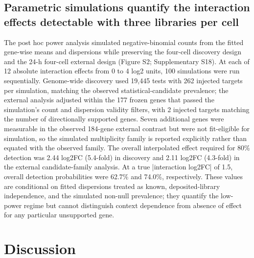 \documentclass[12pt,letterpaper]{article}
\begin{document}
\subsection*{Parametric simulations quantify the interaction effects detectable with three libraries per cell}

The post hoc power analysis simulated negative-binomial counts from the fitted gene-wise means and dispersions while preserving the four-cell discovery design and the 24-h four-cell external design (Figure S2; Supplementary S18). At each of 12 absolute interaction effects from 0 to 4 log2 units, 100 simulations were run sequentially. Genome-wide discovery used 19,445 tests with 262 injected targets per simulation, matching the observed statistical-candidate prevalence; the external analysis adjusted within the 177 frozen genes that passed the simulation's count and dispersion validity filters, with 2 injected targets matching the number of directionally supported genes. Seven additional genes were measurable in the observed 184-gene external contrast but were not fit-eligible for simulation, so the simulated multiplicity family is reported explicitly rather than equated with the observed family. The overall interpolated effect required for 80\% detection was 2.44 log2FC (5.4-fold) in discovery and 2.11 log2FC (4.3-fold) in the external candidate-family analysis. At a true |interaction log2FC| of 1.5, overall detection probabilities were 62.7\% and 74.0\%, respectively. These values are conditional on fitted dispersions treated as known, deposited-library independence, and the simulated non-null prevalence; they quantify the low-power regime but cannot distinguish context dependence from absence of effect for any particular unsupported gene.

\section*{Discussion}
\end{document}
